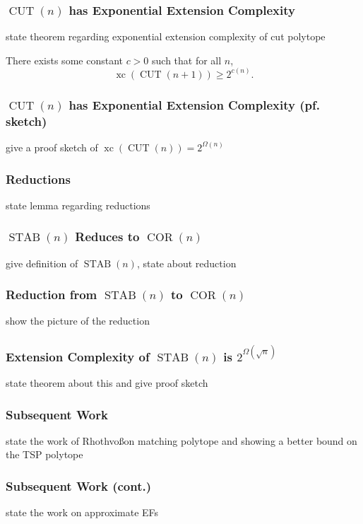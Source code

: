 \documentclass{beamer}
\newcommand{\xc}{\operatorname{xc}}
\newcommand{\STAB}{\operatorname{STAB}}
\newcommand{\CUT}{\operatorname{CUT}}
\newcommand{\COR}{\operatorname{COR}}
\begin{document}
\begin{frame}
\frametitle{$\CUT(n)$ has Exponential Extension Complexity}
state theorem regarding exponential extension complexity of cut polytope

\begin{theorem}
There exists some constant $c > 0$ such that for all $n$,
\[
\xc(\CUT(n+1)) \geq 2^{c(n)}.
\]
\end{theorem}
\end{frame}

\begin{frame}
\frametitle{$\CUT(n)$ has Exponential Extension Complexity (pf. sketch)}
give a proof sketch of $\xc(\CUT(n)) = 2^{\Omega(n)}$

\end{frame}

\begin{frame}
\frametitle{Reductions}
state lemma regarding reductions
\end{frame}

\begin{frame}
\frametitle{$\STAB(n)$ Reduces to $\COR(n)$}
give definition of $\STAB(n)$, state about reduction
\end{frame}

\begin{frame}
\frametitle{Reduction from $\STAB(n)$ to $\COR(n)$}
show the picture of the reduction
\end{frame}

\begin{frame}
\frametitle{Extension Complexity of $\STAB(n)$ is $2^{\Omega(\sqrt{n})}$}
state theorem about this and give proof sketch
\end{frame}

\begin{frame}
\frametitle{Subsequent Work}
state the work of Rhothvo\ss on matching polytope and showing a better bound on the TSP polytope
\end{frame}

\begin{frame}
\frametitle{Subsequent Work (cont.)}
state the work on approximate EFs
\end{frame}
\end{document}
